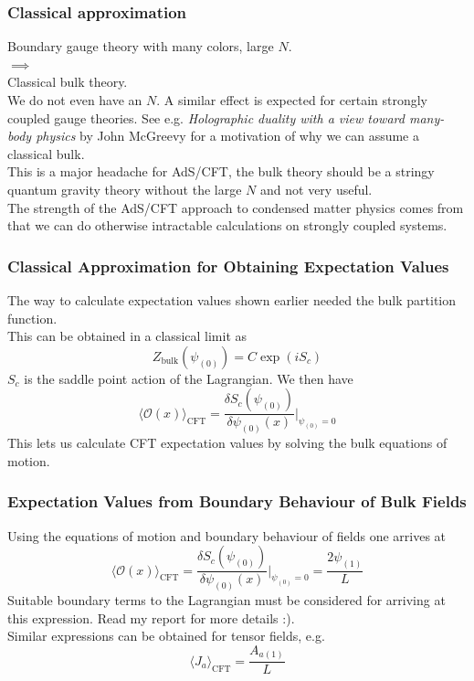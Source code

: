 \documentclass{beamer}
\renewcommand{\i}{\ensuremath{i}}
\begin{document}
\begin{frame}
\frametitle{Classical approximation}
Boundary gauge theory with many colors, large $N$.\\
$\implies$\\
Classical bulk theory.\\
\vspace{0.5cm}
We do not even have an $N$. A similar effect is expected for certain strongly coupled gauge theories. See e.g. \emph{Holographic duality with a view toward many-body physics} by John McGreevy for a motivation of why we can assume a classical bulk.\\
\vspace{0.5cm}
This is a major headache for AdS/CFT, the bulk theory should be a stringy quantum gravity theory without the large $N$ and not very useful.\\
\vspace{0.5cm}
The strength of the AdS/CFT approach to condensed matter physics comes from that we can do otherwise intractable calculations on strongly coupled systems.
\end{frame}


\begin{frame}
\frametitle{Classical Approximation for Obtaining Expectation Values}
The way to calculate expectation values shown earlier needed the bulk partition function.\\
This can be obtained in a classical limit as
\begin{equation}
 Z_{\mathrm{bulk}}(\psi_{(0)})=C\exp(\i S_c)\label{semi}
\end{equation}
$S_c$ is the saddle point action of the Lagrangian. We then have 
\begin{equation}
\langle \mathcal{O}(x) \rangle_{\mathrm{CFT}}=\frac{\delta S_c(\psi_{(0)})}{\delta\psi_{(0)}(x)}|_{\psi_{(0)}=0}
\end{equation}
This lets us calculate CFT expectation values by solving the bulk equations of motion.
\end{frame}


\begin{frame}
\frametitle{Expectation Values from Boundary Behaviour of Bulk Fields}
Using the equations of motion and boundary behaviour of fields one arrives at
\begin{equation}
\langle \mathcal{O}(x) \rangle_{\mathrm{CFT}}=\frac{\delta S_c(\psi_{(0)})}{\delta\psi_{(0)}(x)}|_{\psi_{(0)}=0}
=\frac{2\psi_{(1)}}{L}
\end{equation}
Suitable boundary terms to the Lagrangian must be considered for arriving at this expression. Read my report for more details :).\\
Similar expressions can be obtained for tensor fields, e.g.\\
 \begin{equation}
 \langle J_a\rangle_{\mathrm{CFT}}=\frac{A_{a(1)}}{L}
\end{equation}
\end{frame}
\end{document}
